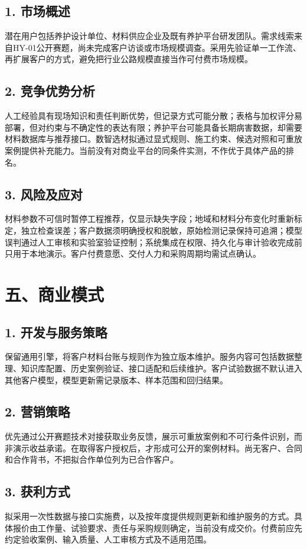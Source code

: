 \documentclass[UTF8,fontset=none,zihao=-4,a4paper]{ctexart}
\begin{document}
\subsection*{1. 市场概述}
潜在用户包括养护设计单位、材料供应企业及既有养护平台研发团队。需求线索来自HY-01公开赛题，尚未完成客户访谈或市场规模调查。采用先验证单一工作流、再扩展客户的方式，避免把行业公路规模直接当作可付费市场规模。

\subsection*{2. 竞争优势分析}
人工经验具有现场知识和责任判断优势，但记录方式可能分散；表格与加权评分易部署，但对约束与不确定性的表达有限；养护平台可能具备长期病害数据，却需要材料数据库与推荐接口。数智选材拟通过显式规则、施工约束、候选对照和可重放案例提供补充能力。当前没有对商业平台的同条件实测，不作优于具体产品的排名。

\subsection*{3. 风险及应对}
材料参数不可信时暂停工程推荐，仅显示缺失字段；地域和材料分布变化时重新标定，独立检查误差；客户数据须明确授权和脱敏，原始检测记录保持可追溯；模型误判通过人工审核和实验室验证控制；系统集成在权限、持久化与审计验收完成前只用于本地演示。客户付费意愿、交付人力和采购周期均需试点确认。

\section*{五、商业模式}
\subsection*{1. 开发与服务策略}
保留通用引擎，将客户材料台账与规则作为独立版本维护。服务内容可包括数据整理、知识库配置、历史案例验证、接口适配和后续维护。客户试验数据不默认进入其他客户模型，模型更新需记录版本、样本范围和回归结果。

\subsection*{2. 营销策略}
优先通过公开赛题技术对接获取业务反馈，展示可重放案例和不可行条件识别，而非演示收益承诺。在取得客户授权后，才形成可公开的案例材料。尚无客户、合同和合作背书，不把拟合作单位列为已合作客户。

\subsection*{3. 获利方式}
拟采用一次性数据与接口实施费，以及按年度提供规则更新和维护服务的方式。具体报价由工作量、试验要求、责任与采购规则确定，当前没有成交价。付费前应先约定验收案例、输入质量、人工审核方式及不适用范围。
\end{document}
